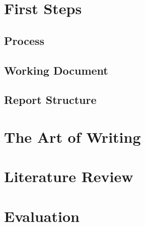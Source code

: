 \documentclass[a4paper]{memoir}
\begin{document}
\chapter{First Steps}

\section{Process}

\section{Working Document}

\section{Report Structure}

\chapter{The Art of Writing}

\chapter{Literature Review}

\chapter{Evaluation}
\end{document}

